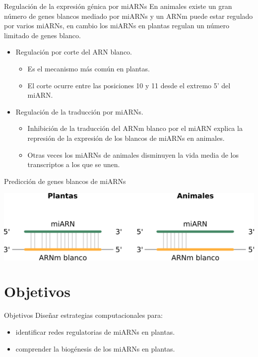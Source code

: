\documentclass{beamer}
\begin{document}
\begin{frame}{Regulación de la expresión génica por miARNs}
En animales existe un gran número de genes blancos mediado por miARNs y un ARNm puede estar regulado por varios miARNs, en cambio los miARNs en plantas regulan un número limitado de genes blanco.
    \begin{itemize}
        \item<2-> Regulación por corte del ARN blanco.
        \begin{itemize}
            \item Es el mecanismo más común en plantas.
            \item El corte ocurre entre las posiciones 10 y 11 desde el extremo 5’ del miARN.
        \end{itemize}
        \item<3-> Regulación de la traducción por miARNs.
        \begin{itemize}
            \item Inhibición de la traducción del ARNm blanco por el miARN explica la represión de la expresión de los blancos de miARNs en animales.
            \item Otras veces los miARNs de animales disminuyen la vida media de los transcriptos a los que se unen.
        \end{itemize}

    \end{itemize}
\end{frame}

\begin{frame}{Predicción de genes blancos de miARNs}
	\begin{center}
		\includegraphics[width=1\textwidth]{img/interaccion_miRNA_target.png}
	\end{center}
\end{frame}


\section{Objetivos}

\begin{frame}{Objetivos}
    Diseñar estrategias computacionales para:
	\begin{itemize}[<+->]
        \item identificar redes regulatorias de miARNs en plantas.
        \item comprender la biogénesis de los miARNs en plantas.
	\end{itemize}
\end{frame}
\end{document}
